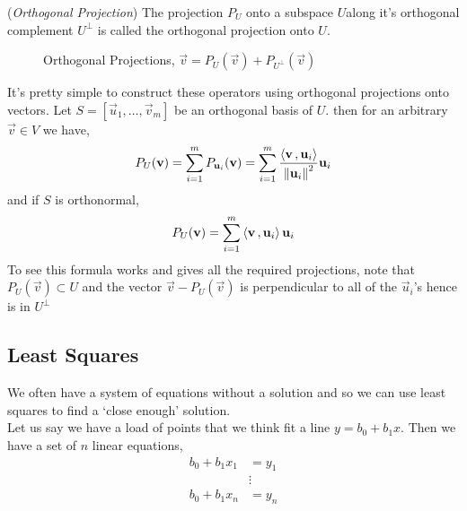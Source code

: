 \documentclass{article}
\begin{document}
\begin{ndefi}{(\textit{Orthogonal Projection})}
  The projection $P_U$ onto a subspace $U$along it's orthogonal complement $U^\bot$ is called the orthogonal projection onto $U$.
\end{ndefi}

\begin{figure}[!ht]
  \centering
  \caption{Orthogonal Projections, $\vec v = P_U(\vec v) + P_{U^\bot} (\vec v)$}
  \label{fig:OrthogProj2}
\end{figure}

It's pretty simple to construct these operators using orthogonal projections onto vectors. Let $S = [\vec u_1, \dots, \vec v_m]$ be an orthogonal basis of $U$. then for an arbitrary $\vec v\in V$ we have,
$$ P_U(\boldsymbol{\mathbf{v}}) = \sum_{i=1}^m P_{\boldsymbol{\mathbf{u}}_i}(\boldsymbol{\mathbf{v}}) = \sum_{i=1}^m {\frac{\left\langle \boldsymbol{\mathbf{v}}\,, \boldsymbol{\mathbf{u}}_i \right\rangle}{\left\lVert \boldsymbol{\mathbf{u}}_i\right\rVert^2}\boldsymbol{\mathbf{u}}_i} $$
and if $S$ is orthonormal,
$$ P_U(\boldsymbol{\mathbf{v}}) = \sum_{i=1}^m \left\langle \boldsymbol{\mathbf{v}}\,, \boldsymbol{\mathbf{u}}_i \right\rangle\boldsymbol{\mathbf{u}}_i $$
To see this formula works and gives all the required projections, note that $P_U(\vec v)\subset U$ and the vector $\vec v - P_U(\vec v)$ is perpendicular to all of the $\vec u_i$'s hence is in $U^\bot$

\subsection{Least Squares}
We often have a system of equations without a solution and so we can use least squares to find a `close enough' solution.\\

Let us say we have a load of points that we think fit a line $\displaystyle{y = b_0 + b_1x}$. Then we have a set of $n$ linear equations,
\begin{align*}
  b_0 + b_1x_1 &= y_1\\
  &\vdots\\
  b_0 + b_1x_n &= y_n
\end{align*}
\end{document}
